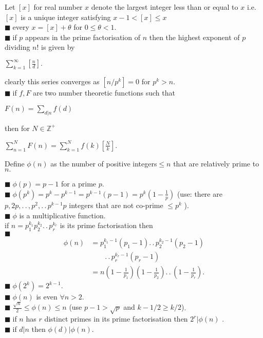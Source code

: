 \documentclass[11pt]{extarticle}
\newcommand{\Z}{\mathbb{Z}}
\newcommand{\ck}{.\,.\,}
\newcommand{\sm}[2]{\displaystyle\sum_{#1}^{#2}}
\newcommand{\snote}[1]{{\footnotesize(#1)}}
\newcommand{\tbx}[2][]{
\begin{tcolorbox}[enhanced,breakable,size=small,colback=black!2!white,title={#1},arc is angular, arc=1.5mm,
	drop fuzzy shadow]
	#2
\end{tcolorbox}
}
\newcommand{\y}{$\blacksquare\;$}
\begin{document}
\begin{multicols}{2}
\tbx[Greatest integer function]{ 
Let $ [x] $ for real number $ x $ denote the largest integer less than or equal to $ x $ i.e. $ [x] $ is a unique integer satisfying $ x-1<[x]\leq x $\\
\y every $ x=[x]+\theta  $ for $ 0\leq \theta <1. $ \\
\y if $ p $ appears in the prime factorisation of $ n $ then the highest exponent of $ p $ dividing $ n! $ is given by 
\begin{center}
 $ \sm{k=1}{\infty}\left[\frac{ n }{d} \right]. $ 
 \end{center}
 
clearly this series converges as $ [n/p^k]=0 $ for $ p^k>n. $\\
\y if $ f,F $ are two number theoretic functions such that 

\begin{center}
 $  F(n)=\sm{d|n}{}f(d) $ 
 \end{center}

then for $ N\in \Z^+ $ 
\begin{center}
	$ \sm{n=1}{N}F(n)=\sm{k=1}{N}f(k)\left[\frac{ N }{k} \right] .$
	\end{center}  }
\tbx[Euler's $ \phi $ function]{
Define $ \phi(n) $ as the number of positive integers$\leq n $ that are relatively prime to $ n. $ }
\tbx{
\y $ \phi(p)=p-1 $ for a prime $p.  $ \\
\y $ \phi(p^k)=p^k-p^{k-1}=p^{k-1}(p-1)=p^{k}(1-\frac{ 1 }{p} ) $ \snote{use: there are $ p,2p,\ck ,p^2,\ck p^{k-1}p $ integers that are not co-prime $\leq p^{k} $ }.\\ 
 \y $ \phi $ is a multiplicative function.\\
if $ n= p_1^{k_1}p_2^{k_2}\ck p_r^{k_r}$ is its prime factorisation then \\
\y \begin{align*}
	 \phi(n)&=p_1^{k_1-1}(p_1-1) \ck p_2^{k_2-1}(p_2-1)\\
	 & \qquad \ck p_r^{k_r-1}(p_r-1) \\
	 &=n(1-\frac{ 1 }{p_1} )(1-\frac{ 1 }{p_2} )\ck (1-\frac{ 1 }{ p_r }).
\end{align*}  
\y $ \phi(2^k)=2^{k-1} .$ \\
\y $ \phi(n) $ is even $ \forall n>2. $ \\
\y $ \frac{ \sqrt{n} }{2} \leq \phi(n) \leq n$ \snote{use $ p-1>\sqrt{p} $ and $ k-1/2\geq k/2 $}. \\
\y if $ n $ has $ r $ distinct primes in its prime factorisation then $ 2^r|\phi(n) $ .\\
\y if $ d|n $ then $ \phi(d)|\phi(n). $ \\
}

\end{multicols}
\end{document}
